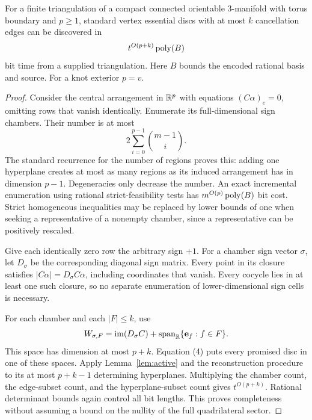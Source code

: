 \begin{theorem}
\label{thm:multivertex}
For a finite triangulation of a compact connected orientable 3-manifold
with torus boundary and $p\ge1$, standard vertex essential discs with at most $k$
cancellation edges can be discovered in
\[
                      t^{O(p+k)}\operatorname{poly}(B)
\]
bit time from a supplied triangulation. Here $B$ bounds the encoded
rational basis and source. For a knot exterior $p=v$.
\end{theorem}
\begin{proof}
Consider the central arrangement in $\mathbb R^p$ with equations
$(C\alpha)_e=0$, omitting rows that vanish identically. Enumerate its
full-dimensional sign chambers. Their number is at most
\[
                    2\sum_{i=0}^{p-1}\binom{m-1}{i}.      \tag{13}\label{eq:chambers}
\]
The standard recurrence for the number of regions proves this: adding
one hyperplane creates at most as many regions as its induced arrangement
has in dimension $p-1$. Degeneracies only decrease the number.
An exact incremental enumeration using rational strict-feasibility tests
has $m^{O(p)}\operatorname{poly}(B)$ bit cost. Strict homogeneous inequalities may be replaced
by lower bounds of one when seeking a representative of a nonempty
chamber, since a representative can be positively rescaled.

Give each identically zero row the arbitrary sign $+1$.
For a chamber sign vector $\sigma$, let $D_\sigma$ be the corresponding
diagonal sign matrix. Every point in its closure satisfies
$|C\alpha|=D_\sigma C\alpha$, including coordinates that vanish.
Every cocycle lies in at least one such closure, so no separate
enumeration of lower-dimensional sign cells is necessary.

For each chamber and each $|F|\le k$, use
\[
             W_{\sigma,F}=\operatorname{im}(D_\sigma C)
                            +\operatorname{span}_{\mathbb R}\{\mathbf e_f:f\in F\}.
\]
This space has dimension at most $p+k$. Equation (4) puts every promised
disc in one of these spaces. Apply Lemma~\ref{lem:active} and the
reconstruction procedure to its at most $p+k-1$ determining hyperplanes.
Multiplying the chamber count, the edge-subset count, and the
hyperplane-subset count gives $t^{O(p+k)}$. Rational determinant bounds
again control all bit lengths. This proves completeness without
assuming a bound on the nullity of the full quadrilateral sector.
\end{proof}

